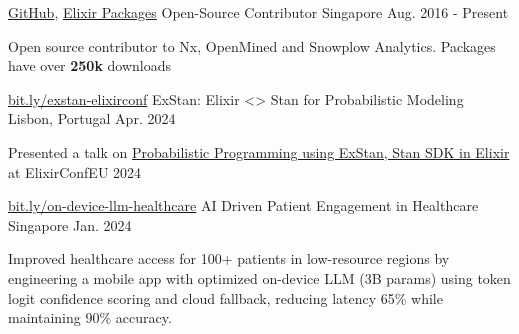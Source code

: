 


\begin{cventries}

  \cventry
    {\href{https://github.com/goodhamgupta}{GitHub}, \href{https://bit.ly/elixir-packages}{Elixir Packages}}
    {Open-Source Contributor} %
    {Singapore} %
    {Aug. 2016 - Present} %
    {
      \begin{cvitems} %
        \item {Open source contributor to Nx, OpenMined and Snowplow Analytics. Packages have over \textbf{250k} downloads}
      \end{cvitems}
    }


  \cventry
    {\href{https://bit.ly/exstan-elixirconf}{bit.ly/exstan-elixirconf}}
    {ExStan: Elixir <> Stan for Probabilistic Modeling} %
    {Lisbon, Portugal} %
    {Apr. 2024} %
    {
      \begin{cvitems} %
        \item {Presented a talk on \href{https://github.com/goodhamgupta/ex_stan}{Probabilistic Programming using ExStan, Stan SDK in Elixir} at ElixirConfEU 2024 }
      \end{cvitems}
    }


  \cventry
    {\href{https://bit.ly/on-device-llm-healthcare}{bit.ly/on-device-llm-healthcare}}
    {AI Driven Patient Engagement in Healthcare} %
    {Singapore} %
    {Jan. 2024} %
    {
      \begin{cvitems} %
        \item {Improved healthcare access for 100+ patients in low-resource regions by engineering a mobile app with optimized on-device LLM (3B params) using token logit confidence scoring and cloud fallback, reducing latency 65\% while maintaining 90\% accuracy.}
      \end{cvitems}
    }
    

\end{cventries}
